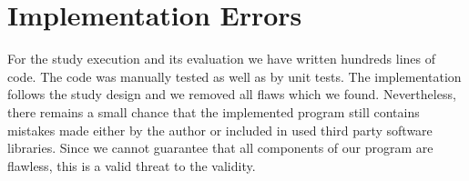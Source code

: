 \section{Implementation Errors}
\label{chp:threats_to_validity:sec:implementation_errors}

For the study execution and its evaluation we have written hundreds lines of code.
The code was manually tested as well as by unit tests.
The implementation follows the study design and we removed all flaws which we found.
Nevertheless, there remains a small chance that the implemented program still contains mistakes made either by the author or included in used third party software libraries.
Since we cannot guarantee that all components of our program are flawless, this is a valid threat to the validity.
